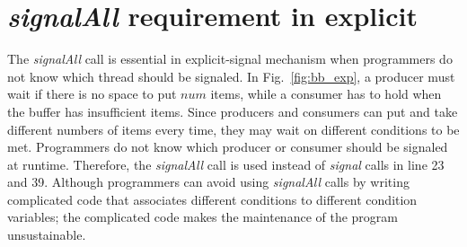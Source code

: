 \documentclass[preprint]{sigplanconf}
\begin{document}

\section{{\em signalAll} requirement in explicit} 
\label{sec:sigAll}
The {\em signalAll} call is essential in explicit-signal mechanism when programmers
do not know which thread should be signaled. In Fig.~\ref{fig:bb_exp}, a 
producer must wait if there is no space to put $num$ items, while a consumer 
has to hold when the buffer has insufficient items.
Since producers and consumers can put and take different numbers of items
every time, they may wait on different conditions to be met. Programmers 
do not know which producer or consumer should be signaled at runtime. 
Therefore, the {\em signalAll} call is used instead of {\em signal} calls in
line 23 and 39.
Although programmers can avoid using {\em signalAll} calls by writing
complicated code that associates different conditions to different condition 
variables; the complicated code makes the maintenance of the program
unsustainable. 

\end{document}
